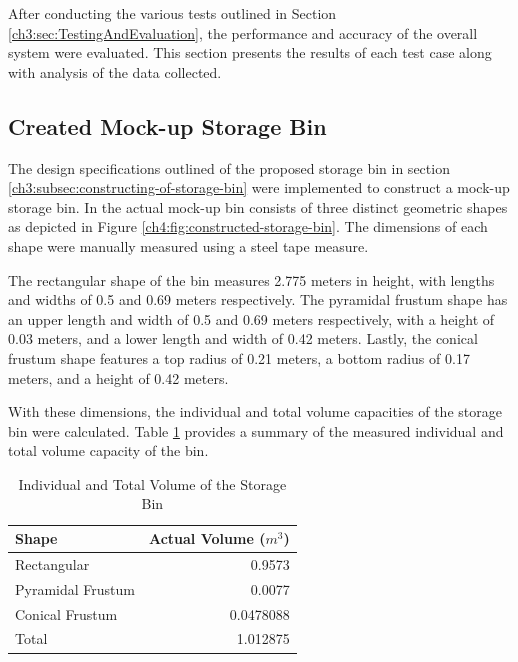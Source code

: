 After conducting the various tests outlined in Section \ref{ch3:sec:TestingAndEvaluation}, the performance and accuracy of the overall system were evaluated. This section presents the results of each test case along with analysis of the data collected.

\subsection{Created Mock-up Storage Bin}
The design specifications outlined of the proposed storage bin in section \ref{ch3:subsec:constructing-of-storage-bin} were implemented to construct a mock-up storage bin. In the actual mock-up bin consists of three distinct geometric shapes as depicted in Figure \ref{ch4:fig:constructed-storage-bin}. The dimensions of each shape were manually measured using a steel tape measure.

The rectangular shape of the bin measures 2.775 meters in height, with lengths and widths of 0.5 and 0.69 meters respectively. The pyramidal frustum shape has an upper length and width of 0.5 and 0.69 meters respectively, with a height of 0.03 meters, and a lower length and width of 0.42 meters. Lastly, the conical frustum shape features a top radius of 0.21 meters, a bottom radius of 0.17 meters, and a height of 0.42 meters.

With these dimensions, the individual and total volume capacities of the storage bin were calculated. Table \ref{ch4:tab:volume-calculation} provides a summary of the measured individual and total volume capacity of the bin. \\

\begin{table}[H]
	\centering
	\caption{Individual and Total Volume of the Storage Bin}
	\label{ch4:tab:volume-calculation}
	\begin{tabular}{l r}
		\toprule
		\textbf{Shape}    & \textbf{Actual Volume ($m^{3}$)} \\ \midrule

		Rectangular       & 0.9573                           \\

		Pyramidal Frustum & 0.0077                           \\

		Conical Frustum   & 0.0478088                        \\ \midrule

		Total             & 1.012875                         \\ \bottomrule
	\end{tabular}
\end{table}

